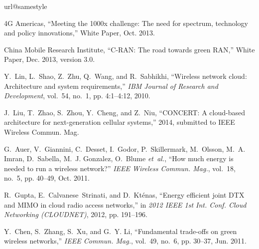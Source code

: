 \documentclass[conference]{IEEEtran}
\begin{document}
\begin{thebibliography}{10}
\providecommand{\url}[1]{#1}
\csname url@samestyle\endcsname
\providecommand{\newblock}{\relax}
\providecommand{\bibinfo}[2]{#2}
\providecommand{\BIBentrySTDinterwordspacing}{\spaceskip=0pt\relax}
\providecommand{\BIBentryALTinterwordstretchfactor}{4}
\providecommand{\BIBentryALTinterwordspacing}{\spaceskip=\fontdimen2\font plus
\BIBentryALTinterwordstretchfactor\fontdimen3\font minus
  \fontdimen4\font\relax}
\providecommand{\BIBforeignlanguage}[2]{{\expandafter\ifx\csname l@#1\endcsname\relax
\typeout{** WARNING: IEEEtran.bst: No hyphenation pattern has been}\typeout{** loaded for the language `#1'. Using the pattern for}\typeout{** the default language instead.}\else
\language=\csname l@#1\endcsname
\fi
#2}}
\providecommand{\BIBdecl}{\relax}
\BIBdecl

{4G Americas}, ``Meeting the 1000x challenge: The need for spectrum, technology
  and policy innovations,'' White Paper, Oct. 2013.

{China Mobile Research Institute}, ``{C-RAN}: The road towards green {RAN},''
  White Paper, Dec. 2013, version 3.0.

Y.~Lin, L.~Shao, Z.~Zhu, Q.~Wang, and R.~Sabhikhi, ``Wireless network cloud:
  Architecture and system requirements,'' \emph{IBM Journal of Research and
  Development}, vol.~54, no.~1, pp. 4:1--4:12, 2010.

J.~Liu, T.~Zhao, S.~Zhou, Y.~Cheng, and Z.~Niu, ``{CONCERT}: A cloud-based
  architecture for next-generation cellular systems,'' 2014, submitted to
  {IEEE} Wireless Commun. Mag.

G.~Auer, V.~Giannini, C.~Desset, I.~Godor, P.~Skillermark, M.~Olsson, M.~A.
  Imran, D.~Sabella, M.~J. Gonzalez, O.~Blume \emph{et~al.}, ``How much energy
  is needed to run a wireless network?'' \emph{{IEEE} Wireless Commun. Mag.},
  vol.~18, no.~5, pp. 40--49, Oct. 2011.

R.~Gupta, E.~Calvanese~Strinati, and D.~Kt{\'e}nas, ``Energy efficient joint
  {DTX} and {MIMO} in cloud radio access networks,'' in \emph{2012 IEEE 1st
  Int. Conf. Cloud Networking (CLOUDNET)}, 2012, pp. 191--196.

Y.~Chen, S.~Zhang, S.~Xu, and G.~Y. Li, ``Fundamental trade-offs on green
  wireless networks,'' \emph{{IEEE} Commun. Mag.}, vol.~49, no.~6, pp. 30--37,
  Jun. 2011.


\end{thebibliography}
\end{document}
